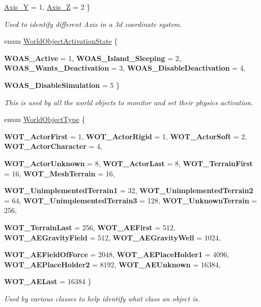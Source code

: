 \begin{DoxyCompactItemize}
\hyperlink{namespaceMezzanine_ab41a00a8c6a47b576dc987ec34e16ba1a935c7afe0104697553cf85e9214fb3fb}{Axis\_\-Y} =  1, 
\hyperlink{namespaceMezzanine_ab41a00a8c6a47b576dc987ec34e16ba1a6af6621383cc7da1fe11a86ba6de37c0}{Axis\_\-Z} =  2
 \}
\begin{DoxyCompactList}\small\item\em Used to identify different Axis in a 3d coordinate system. \item\end{DoxyCompactList}\item 
enum \hyperlink{namespaceMezzanine_ac4d9d4570b1963390325ad6a083108e1}{WorldObjectActivationState} \{ \par
{\bfseries WOAS\_\-Active} =  1, 
{\bfseries WOAS\_\-Island\_\-Sleeping} =  2, 
{\bfseries WOAS\_\-Wants\_\-Deactivation} =  3, 
{\bfseries WOAS\_\-DisableDeactivation} =  4, 
\par
{\bfseries WOAS\_\-DisableSimulation} =  5
 \}
\begin{DoxyCompactList}\small\item\em This is used by all the world objects to monitor and set their physics activation. \item\end{DoxyCompactList}\item 
enum \hyperlink{namespaceMezzanine_a30335416fc857844e8360c84d1d1b56c}{WorldObjectType} \{ \par
{\bfseries WOT\_\-ActorFirst} =  1, 
{\bfseries WOT\_\-ActorRigid} =  1, 
{\bfseries WOT\_\-ActorSoft} =  2, 
{\bfseries WOT\_\-ActorCharacter} =  4, 
\par
{\bfseries WOT\_\-ActorUnknown} =  8, 
{\bfseries WOT\_\-ActorLast} =  8, 
{\bfseries WOT\_\-TerrainFirst} =  16, 
{\bfseries WOT\_\-MeshTerrain} =  16, 
\par
{\bfseries WOT\_\-UnimplementedTerrain1} =  32, 
{\bfseries WOT\_\-UnimplementedTerrain2} =  64, 
{\bfseries WOT\_\-UnimplementedTerrain3} =  128, 
{\bfseries WOT\_\-UnknownTerrain} =  256, 
\par
{\bfseries WOT\_\-TerrainLast} =  256, 
{\bfseries WOT\_\-AEFirst} =  512, 
{\bfseries WOT\_\-AEGravityField} =  512, 
{\bfseries WOT\_\-AEGravityWell} =  1024, 
\par
{\bfseries WOT\_\-AEFieldOfForce} =  2048, 
{\bfseries WOT\_\-AEPlaceHolder1} =  4096, 
{\bfseries WOT\_\-AEPlaceHolder2} =  8192, 
{\bfseries WOT\_\-AEUnknown} =  16384, 
\par
{\bfseries WOT\_\-AELast} =  16384
 \}
\begin{DoxyCompactList}\small\item\em Used by various classes to help identify what class an object is. \item\end{DoxyCompactList}\end{DoxyCompactItemize}
